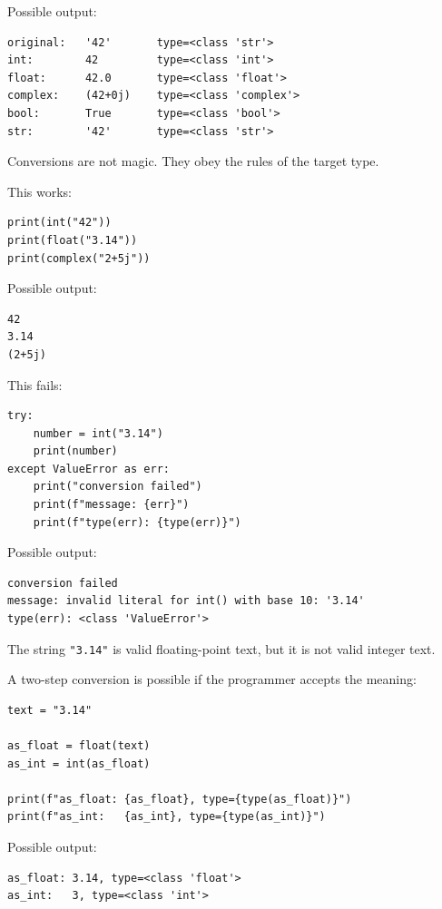 Possible output:

\begin{verbatim}
original:   '42'       type=<class 'str'>
int:        42         type=<class 'int'>
float:      42.0       type=<class 'float'>
complex:    (42+0j)    type=<class 'complex'>
bool:       True       type=<class 'bool'>
str:        '42'       type=<class 'str'>
\end{verbatim}

Conversions are not magic. They obey the rules of the target type.

This works:

\begin{verbatim}
print(int("42"))
print(float("3.14"))
print(complex("2+5j"))
\end{verbatim}

Possible output:

\begin{verbatim}
42
3.14
(2+5j)
\end{verbatim}

This fails:

\begin{verbatim}
try:
    number = int("3.14")
    print(number)
except ValueError as err:
    print("conversion failed")
    print(f"message: {err}")
    print(f"type(err): {type(err)}")
\end{verbatim}

Possible output:

\begin{verbatim}
conversion failed
message: invalid literal for int() with base 10: '3.14'
type(err): <class 'ValueError'>
\end{verbatim}

The string \texttt{"3.14"} is valid floating-point text, but it is not valid integer text.

A two-step conversion is possible if the programmer accepts the meaning:

\begin{verbatim}
text = "3.14"

as_float = float(text)
as_int = int(as_float)

print(f"as_float: {as_float}, type={type(as_float)}")
print(f"as_int:   {as_int}, type={type(as_int)}")
\end{verbatim}

Possible output:

\begin{verbatim}
as_float: 3.14, type=<class 'float'>
as_int:   3, type=<class 'int'>
\end{verbatim}

